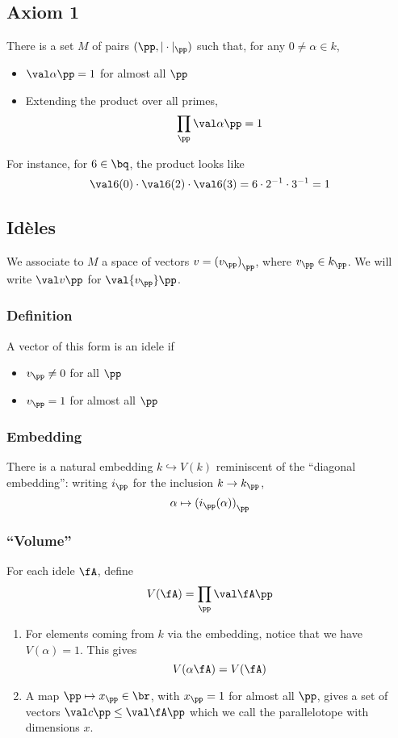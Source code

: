 \subsection{Axiom 1}
\label{sec:orgheadline7}
There is a set \(M\) of pairs \((\pp, |\cdot|_\pp)\) such that, for any \(0\neq \alpha \in k\),
\begin{itemize}
\item \(\val\alpha\pp = 1\) for almost all \(\pp\)
\item Extending the product over all primes, 
\[ \prod_\pp \val\alpha\pp = 1 \]
\end{itemize}
For instance, for \(6\in\bq\), the product looks like
\[ \val6{(0)} \cdot\val6{(2)}\cdot\val6{(3)} = 6\cdot 2^{-1} \cdot 3^{-1} = 1 \]
\subsection{Idèles}
\label{sec:orgheadline19}
We associate to \(M\) a space of vectors \(v={ (v_\pp) }_\pp\), where \(v_\pp \in k_\pp\). We will write \(\val v\pp\) for \(\val{v_\pp}\pp\).
\subsubsection{Definition}
\label{sec:orgheadline8}
A vector of this form is an idele if 
\begin{itemize}
\item \(v_\pp\neq 0\) for all \(\pp\)
\item \(v_\pp = 1\) for almost all \(\pp\)
\end{itemize}
\subsubsection{Embedding}
\label{sec:orgheadline9}
There is a natural embedding \(k\hookrightarrow V(k)\) reminiscent of the ``diagonal embedding'': writing \(i_\pp\) for the inclusion \(k\to k_\pp\),
\[\alpha\mapsto{ (i_\pp(\alpha)) }_\pp\]
\subsubsection{``Volume''}
\label{sec:orgheadline12}
For each idele \(\fA\), define
\[V(\fA) = \prod_\pp \val\fA\pp \]
\begin{enumerate}
\item For elements coming from \(k\) via the embedding, notice that we have \(V(\alpha) = 1\). This gives
\label{sec:orgheadline10}
\[V(\alpha\fA) = V(\fA)\]
\item A map \(\pp\mapsto x_\pp \in\br\), with \(x_\pp = 1\) for almost all \(\pp\), gives a set of vectors \(\val c\pp \leq \val\fA\pp\) which we call the parallelotope with dimensions \(x\).
\label{sec:orgheadline11}
\end{enumerate}
